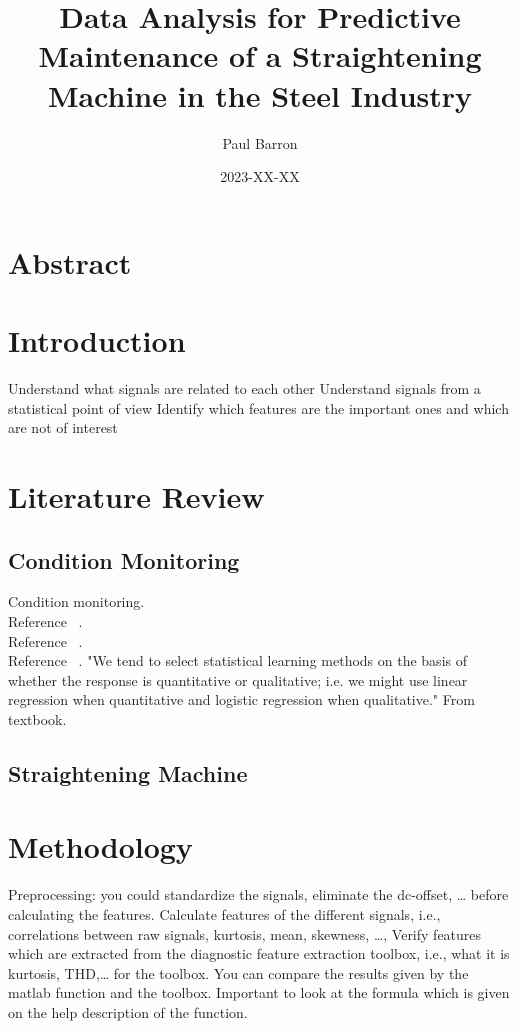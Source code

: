 \documentclass{article}
\title{Data Analysis for Predictive Maintenance of a Straightening Machine in the Steel Industry}
\date{2023-XX-XX}
\author{Paul Barron}
\begin{document}
\maketitle
\newpage
{}
\tableofcontents
\newpage
\section{Abstract}
 
\newpage
\section{Introduction}

Understand what signals are related to each other
Understand signals from a statistical point of view
Identify which features are the important ones and which are not of interest

\newpage  
\section{Literature Review}
\subsection{Condition Monitoring}
Condition monitoring.\\
Reference ~\cite{caesarendra2017review}.\\
Reference ~\cite{james2013introduction}.\\
Reference ~\cite{soualhi2021novel}.
"We tend to select statistical learning methods on the basis of whether
the response is quantitative or qualitative; i.e. we might use linear regression when quantitative and logistic regression when qualitative." From textbook.
\subsection{Straightening Machine}
\newpage  
\section{Methodology}
Preprocessing: you could standardize the signals, eliminate the dc-offset, … before calculating the features.
Calculate features of the different signals, i.e., correlations between raw signals, kurtosis, mean, skewness, …,
Verify features which are extracted from the diagnostic feature extraction toolbox, i.e., what it is kurtosis, THD,… for the toolbox. You can compare the results given by the matlab function and the toolbox. Important to look at the formula which is given on the help description of the function.
\end{document}
